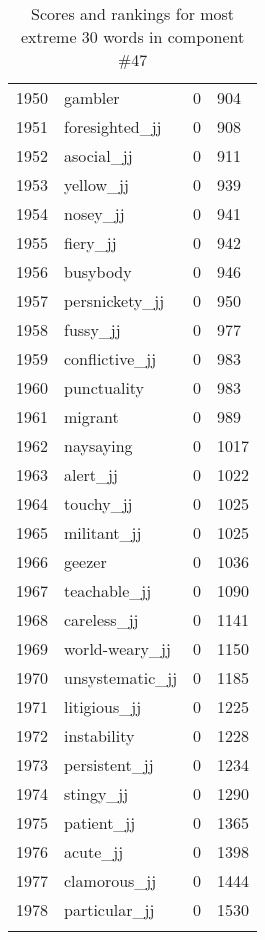\begin{longtable}[!htbp]{| rlr@{.}l |}
    1950 & gambler & 0 & 904 \\
    1951 & foresighted\_jj & 0 & 908 \\
    1952 & asocial\_jj & 0 & 911 \\
    1953 & yellow\_jj & 0 & 939 \\
    1954 & nosey\_jj & 0 & 941 \\
    1955 & fiery\_jj & 0 & 942 \\
    1956 & busybody & 0 & 946 \\
    1957 & persnickety\_jj & 0 & 950 \\
    1958 & fussy\_jj & 0 & 977 \\
    1959 & conflictive\_jj & 0 & 983 \\
    1960 & punctuality & 0 & 983 \\
    1961 & migrant & 0 & 989 \\
    1962 & naysaying & 0 & 1017 \\
    1963 & alert\_jj & 0 & 1022 \\
    1964 & touchy\_jj & 0 & 1025 \\
    1965 & militant\_jj & 0 & 1025 \\
    1966 & geezer & 0 & 1036 \\
    1967 & teachable\_jj & 0 & 1090 \\
    1968 & careless\_jj & 0 & 1141 \\
    1969 & world-weary\_jj & 0 & 1150 \\
    1970 & unsystematic\_jj & 0 & 1185 \\
    1971 & litigious\_jj & 0 & 1225 \\
    1972 & instability & 0 & 1228 \\
    1973 & persistent\_jj & 0 & 1234 \\
    1974 & stingy\_jj & 0 & 1290 \\
    1975 & patient\_jj & 0 & 1365 \\
    1976 & acute\_jj & 0 & 1398 \\
    1977 & clamorous\_jj & 0 & 1444 \\
    1978 & particular\_jj & 0 & 1530 \\
    \hline
    \caption{Scores and rankings for most extreme 30 words in component \#47} \\
\end{longtable}
